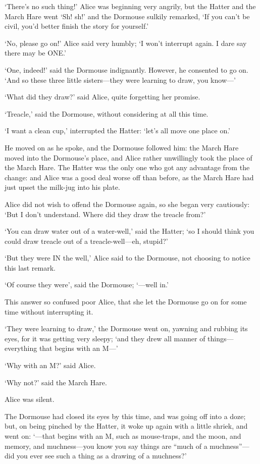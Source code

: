 \documentclass[12pt]{article}
\begin{document}
\begin{Parallel}[p]{}{}
{‘There’s no such thing!’ Alice was beginning very angrily, but the Hatter and the March Hare went ‘Sh! sh!’ and the Dormouse sulkily remarked, ‘If you can’t be civil, you’d better finish the story for yourself.’

‘No, please go on!’ Alice said very humbly; ‘I won’t interrupt again. I dare say there may be ONE.’

‘One, indeed!’ said the Dormouse indignantly. However, he consented to go on. ‘And so these three little sisters—they were learning to draw, you know—’

‘What did they draw?’ said Alice, quite forgetting her promise.

‘Treacle,’ said the Dormouse, without considering at all this time.

‘I want a clean cup,’ interrupted the Hatter: ‘let’s all move one place on.’

He moved on as he spoke, and the Dormouse followed him: the March Hare moved into the Dormouse’s place, and Alice rather unwillingly took the place of the March Hare. The Hatter was the only one who got any advantage from the change: and Alice was a good deal worse off than before, as the March Hare had just upset the milk-jug into his plate.

Alice did not wish to offend the Dormouse again, so she began very cautiously: ‘But I don’t understand. Where did they draw the treacle from?’

‘You can draw water out of a water-well,’ said the Hatter; ‘so I should think you could draw treacle out of a treacle-well—eh, stupid?’

‘But they were IN the well,’ Alice said to the Dormouse, not choosing to notice this last remark.

‘Of course they were’, said the Dormouse; ‘—well in.’

This answer so confused poor Alice, that she let the Dormouse go on for some time without interrupting it.

‘They were learning to draw,’ the Dormouse went on, yawning and rubbing its eyes, for it was getting very sleepy; ‘and they drew all manner of things—everything that begins with an M—’

‘Why with an M?’ said Alice.

‘Why not?’ said the March Hare.

Alice was silent.

The Dormouse had closed its eyes by this time, and was going off into a doze; but, on being pinched by the Hatter, it woke up again with a little shriek, and went on: ‘—that begins with an M, such as mouse-traps, and the moon, and memory, and muchness—you know you say things are “much of a muchness”—did you ever see such a thing as a drawing of a muchness?’

}
\end{Parallel}
\end{document}
